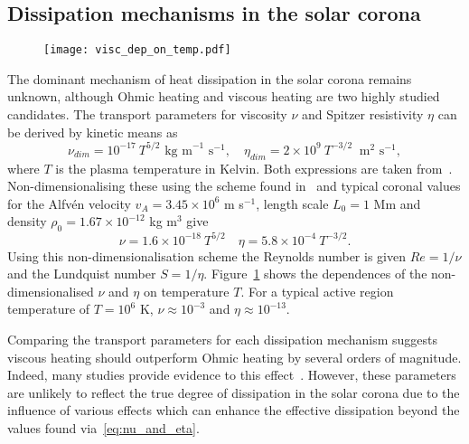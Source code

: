 \subsection{Dissipation mechanisms in the solar corona}

\begin{figure}[t]
  \centering
  \texttt{[image: visc\_dep\_on\_temp.pdf]}
  \label{fig:visc_dep_on_temp}
\end{figure}

The dominant mechanism of heat dissipation in the solar corona remains unknown, although Ohmic heating and viscous heating are two highly studied candidates. The transport parameters for viscosity $\nu$ and Spitzer resistivity $\eta$ can be derived by kinetic means as
\begin{equation}
  \label{eq:nu_and_eta}
\nu_{dim} = 10^{-17}\ T^{5/2} \text{ kg m}^{-1}\text{ s}^{-1}, \quad \eta_{dim} = 2\times 10^{9}\ T^{-3/2}\ \text{ m}^2 \text{ s}^{-1},
\end{equation}
where $T$ is the plasma temperature in Kelvin. Both expressions are taken from~\cite{braginskiiTransportProcessesPlasma1965}. Non-dimensionalising these using the scheme found in~\cite{arberStaggeredGridLagrangian2001} and typical coronal values for the Alfv\'en velocity $v_A = 3.45 \times 10^6$ m s$^{-1}$, length scale $L_0 = 1$ Mm and density $\rho_0 = 1.67 \times 10^{-12}$ kg m$^3$ give
\begin{equation}
  \label{eq:nondim_nu_and_eta}
\nu = 1.6 \times 10^{-18}\ T^{5/2} \quad \eta = 5.8 \times 10^{-4}\ T^{-3/2}.
\end{equation}
Using this non-dimensionalisation scheme the Reynolds number is given $Re = 1/\nu$ and the Lundquist number $S = 1/\eta$. Figure~\ref{fig:visc_dep_on_temp} shows the dependences of the non-dimensionalised $\nu$ and $\eta$ on temperature $T$. For a typical active region temperature of $T = 10^6$ K, $\nu \approx 10^{-3}$ and $\eta \approx 10^{-13}$.

Comparing the transport parameters for each dissipation mechanism suggests viscous heating should outperform Ohmic heating by several orders of magnitude. Indeed, many studies provide evidence to this effect~\cite{browningMechanismsSolarCoronal1991,craigViscousDissipation3D2013,craigAnisotropicViscousDissipation2009a,armstrongViscoResistiveDissipation2013,hollwegViscosityChewGoldbergerLowEquations1986a}. However, these parameters are unlikely to reflect the true degree of dissipation in the solar corona due to the influence of various effects which can enhance the effective dissipation beyond the values found via~\eqref{eq:nu_and_eta}. 

